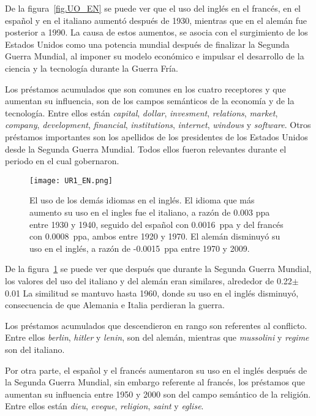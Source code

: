 De la figura~\ref{fig.UO_EN} se puede ver que el uso del inglés en el francés, en el español y en el italiano aumentó después de 1930, mientras que en el alemán fue posterior a 1990.  La causa de estos aumentos, se asocia con el surgimiento de los Estados Unidos como una potencia mundial después de finalizar la Segunda Guerra Mundial,  al  imponer  su modelo económico e impulsar el desarrollo de la ciencia y la tecnología durante la Guerra Fría.

Los préstamos acumulados que son comunes en los cuatro receptores y que aumentan su influencia, son de los campos semánticos de la economía y de la tecnología. Entre ellos están \textit{capital}, \textit{dollar}, \textit{invesment}, \textit{relations}, \textit{market}, \textit{company}, \textit{development}, \textit{financial},  \textit{institutions}, \textit{internet}, \textit{windows} y \textit{software}. Otros préstamos importantes son los apellidos de los presidentes de los Estados Unidos desde la Segunda Guerra Mundial. Todos ellos fueron relevantes durante el periodo en el cual gobernaron. 
\label{EN-D}

\begin{figure}[h!]
	\centering
	\texttt{[image: UR1\_EN.png]}
	\caption{El uso de los demás idiomas en el inglés. El idioma que más aumento su uso en el ingles fue el italiano, a razón de 0.003 ppa entre 1930 y 1940, seguido del español con 0.0016~ppa y del francés con 0.0008~ppa, ambos entre 1920 y 1970. El alemán disminuyó su uso en el inglés, a razón de -0.0015~ppa entre 1970 y 2009.}
	\label{fig.UR_EN}
\end{figure} 


De la figura~\ref{fig.UR_EN} se puede ver que después que durante la Segunda Guerra Mundial, los valores del uso del italiano y del alemán eran similares, alrededor de 0.22$\pm$0.01 La similitud se mantuvo hasta 1960, donde su uso en el inglés disminuyó, consecuencia de que Alemania e Italia perdieran la guerra.

Los préstamos acumulados que descendieron en rango son referentes al conflicto. Entre ellos \textit{berlin}, \textit{hitler} y \textit{lenin}, son del alemán,  mientras que \textit{mussolini} y \textit{regime} son del italiano. 

Por otra parte, el español y el francés aumentaron su uso en el inglés después de la Segunda Guerra Mundial, sin embargo  referente al francés, los préstamos que aumentan su influencia entre 1950 y 2000 son del campo semántico de la religión. Entre ellos están \textit{dieu}, \textit{eveque}, \textit{religion}, \textit{saint} y \textit{eglise}.

